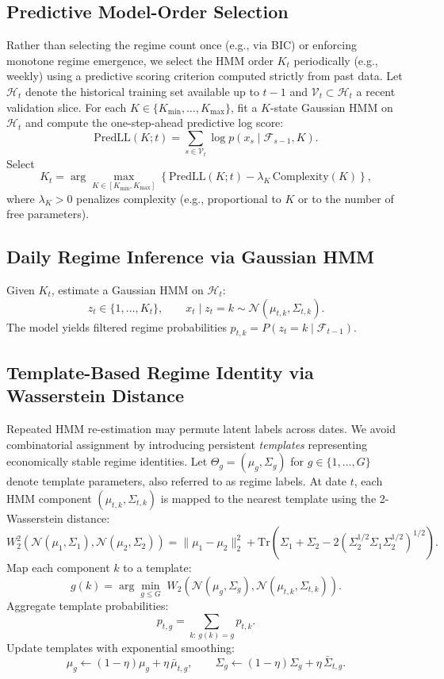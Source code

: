 \documentclass[11pt]{article}
\begin{document}
\subsection{Predictive Model-Order Selection}

Rather than selecting the regime count once (e.g., via BIC) or enforcing monotone regime emergence,
we select the HMM order $K_t$ periodically (e.g., weekly) using a predictive scoring criterion computed strictly from past data.
Let $\mathcal{H}_t$ denote the historical training set available up to $t-1$ and $\mathcal{V}_t\subset \mathcal{H}_t$ a recent validation slice.
For each $K\in\{K_{\min},\dots,K_{\max}\}$, fit a $K$-state Gaussian HMM on $\mathcal{H}_t$ and compute the one-step-ahead predictive log score:
\[
\text{PredLL}(K;t)=\sum_{s\in\mathcal{V}_t} \log p(x_s \mid \mathcal{F}_{s-1}, K).
\]
Select
\[
K_t = \arg\max_{K\in[K_{\min},K_{\max}]} \left\{\text{PredLL}(K;t) - \lambda_K\,\text{Complexity}(K)\right\},
\]
where $\lambda_K>0$ penalizes complexity (e.g., proportional to $K$ or to the number of free parameters).

\subsection{Daily Regime Inference via Gaussian HMM}

Given $K_t$, estimate a Gaussian HMM on $\mathcal{H}_t$:
\[
z_t \in \{1,\dots,K_t\}, \qquad x_t \mid z_t=k \sim \mathcal{N}(\mu_{t,k}, \Sigma_{t,k}).
\]
The model yields filtered regime probabilities $p_{t,k}=P(z_t=k\mid \mathcal{F}_{t-1})$.

\subsection{Template-Based Regime Identity via Wasserstein Distance}

Repeated HMM re-estimation may permute latent labels across dates.
We avoid combinatorial assignment by introducing persistent \emph{templates} representing economically stable regime identities.
Let $\Theta_g=(\mu_g,\Sigma_g)$ for $g\in\{1,\dots,G\}$ denote template parameters, also referred to as regime labels.
At date $t$, each HMM component $(\mu_{t,k},\Sigma_{t,k})$ is mapped to the nearest template using the 2-Wasserstein distance:
\[
W_2^2(\mathcal{N}(\mu_1,\Sigma_1), \mathcal{N}(\mu_2,\Sigma_2)) =
\|\mu_1-\mu_2\|_2^2 + \mathrm{Tr}\!\left(\Sigma_1+\Sigma_2 - 2(\Sigma_2^{1/2}\Sigma_1\Sigma_2^{1/2})^{1/2}\right).
\]
Map each component $k$ to a template:
\[
g(k) = \arg\min_{g\le G} \; W_2(\mathcal{N}(\mu_g,\Sigma_g), \mathcal{N}(\mu_{t,k},\Sigma_{t,k})).
\]
Aggregate template probabilities:
\[
p_{t,g} = \sum_{k:\,g(k)=g} p_{t,k}.
\]
Update templates with exponential smoothing:
\[
\mu_g \leftarrow (1-\eta)\mu_g + \eta\,\bar{\mu}_{t,g},\qquad
\Sigma_g \leftarrow (1-\eta)\Sigma_g + \eta\,\bar{\Sigma}_{t,g}.
\]
\end{document}
